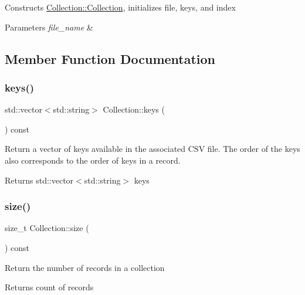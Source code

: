Constructs \hyperlink{class_collection_af4c8b62d3038e1ba081aef0c4ebd912d}{Collection\+::\+Collection}, initializes file, keys, and index


\begin{DoxyParams}{Parameters}
{\em file\+\_\+name} & \\
\hline
\end{DoxyParams}


\subsection{Member Function Documentation}
\mbox{\label{class_collection_aebff0d78673dac8453ebf51ba32d10eb}} 
\subsubsection{\texorpdfstring{keys()}{keys()}}
{\footnotesize\ttfamily std\+::vector$<$std\+::string$>$ Collection\+::keys (\begin{DoxyParamCaption}{ }\end{DoxyParamCaption}) const}

Return a vector of keys available in the associated C\+SV file. The order of the keys also corresponds to the order of keys in a record.

\begin{DoxyReturn}{Returns}
std\+::vector$<$std\+::string$>$ keys 
\end{DoxyReturn}
\mbox{\label{class_collection_ae6922104df8b79051656b77f5019750f}} 
\subsubsection{\texorpdfstring{size()}{size()}}
{\footnotesize\ttfamily size\+\_\+t Collection\+::size (\begin{DoxyParamCaption}{ }\end{DoxyParamCaption}) const}

Return the number of records in a collection

\begin{DoxyReturn}{Returns}
count of records 
\end{DoxyReturn}
\mbox{\label{class_collection_a88502cfa08bc6f1c9eff4974b95d53f3}} 

